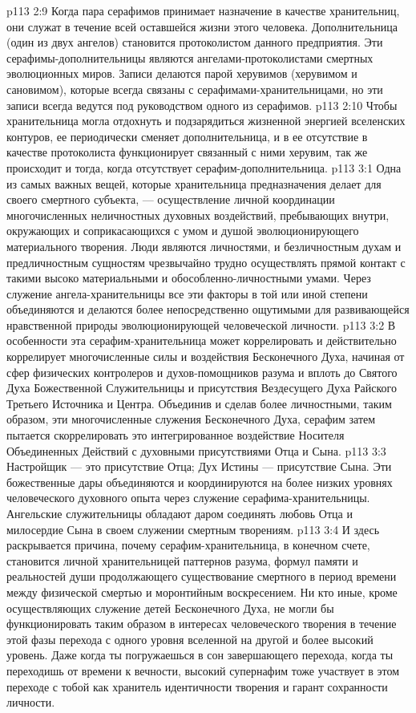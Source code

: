 \vs p113 2:9 Когда пара серафимов принимает назначение в качестве хранительниц, они служат в течение всей оставшейся жизни этого человека. Дополнительница (один из двух ангелов) становится протоколистом данного предприятия. Эти серафимы\hyp{}дополнительницы являются ангелами\hyp{}протоколистами смертных эволюционных миров. Записи делаются парой херувимов (херувимом и сановимом), которые всегда связаны с серафимами\hyp{}хранительницами, но эти записи всегда ведутся под руководством одного из серафимов.
\vs p113 2:10 Чтобы хранительница могла отдохнуть и подзарядиться жизненной энергией вселенских контуров, ее периодически сменяет дополнительница, и в ее отсутствие в качестве протоколиста функционирует связанный с ними херувим, так же происходит и тогда, когда отсутствует серафим\hyp{}дополнительница.
\vs p113 3:1 Одна из самых важных вещей, которые хранительница предназначения делает для своего смертного субъекта, --- осуществление личной координации многочисленных неличностных духовных воздействий, пребывающих внутри, окружающих и соприкасающихся с умом и душой эволюционирующего материального творения. Люди являются личностями, и безличностным духам и предличностным сущностям чрезвычайно трудно осуществлять прямой контакт с такими высоко материальными и обособленно\hyp{}личностными умами. Через служение ангела\hyp{}хранительницы все эти факторы в той или иной степени объединяются и делаются более непосредственно ощутимыми для развивающейся нравственной природы эволюционирующей человеческой личности.
\vs p113 3:2 В особенности эта серафим\hyp{}хранительница может коррелировать и действительно коррелирует многочисленные силы и воздействия Бесконечного Духа, начиная от сфер физических контролеров и духов\hyp{}помощников разума и вплоть до Святого Духа Божественной Служительницы и присутствия Вездесущего Духа Райского Третьего Источника и Центра. Объединив и сделав более личностными, таким образом, эти многочисленные служения Бесконечного Духа, серафим затем пытается скоррелировать это интегрированное воздействие Носителя Объединенных Действий с духовными присутствиями Отца и Сына.
\vs p113 3:3 Настройщик --- это присутствие Отца; Дух Истины --- присутствие Сына. Эти божественные дары объединяются и координируются на более низких уровнях человеческого духовного опыта через служение серафима\hyp{}хранительницы. Ангельские служительницы обладают даром соединять любовь Отца и милосердие Сына в своем служении смертным творениям.
\vs p113 3:4 И здесь раскрывается причина, почему серафим\hyp{}хранительница, в конечном счете, становится личной хранительницей паттернов разума, формул памяти и реальностей души продолжающего существование смертного в период времени между физической смертью и моронтийным воскресением. Ни кто иные, кроме осуществляющих служение детей Бесконечного Духа, не могли бы функционировать таким образом в интересах человеческого творения в течение этой фазы перехода с одного уровня вселенной на другой и более высокий уровень. Даже когда ты погружаешься в сон завершающего перехода, когда ты переходишь от времени к вечности, высокий супернафим тоже участвует в этом переходе с тобой как хранитель идентичности творения и гарант сохранности личности.
